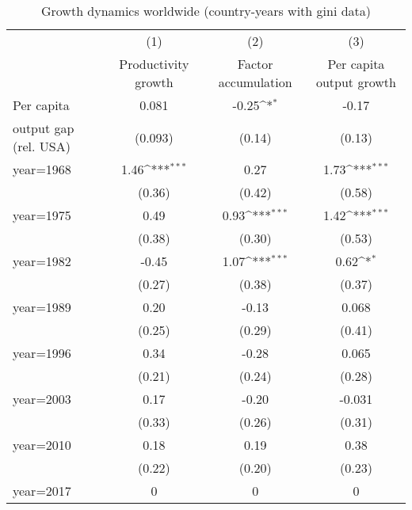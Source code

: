 \begin{table}[htbp]\centering
\def\sym#1{\ifmmode^{#1}\else\(^{#1}\)\fi}
\caption{Growth dynamics worldwide (country-years with gini data)}
\begin{tabular}{l*{3}{c}}
\toprule
                &\multicolumn{1}{c}{(1)}&\multicolumn{1}{c}{(2)}&\multicolumn{1}{c}{(3)}\\
                &\multicolumn{1}{c}{Productivity growth}&\multicolumn{1}{c}{Factor accumulation}&\multicolumn{1}{c}{Per capita output growth}\\
\midrule
Per capita      &    0.081         &    -0.25\sym{*}  &    -0.17         \\
output gap (rel. USA)&  (0.093)         &   (0.14)         &   (0.13)         \\
\addlinespace
year=1968       &     1.46\sym{***}&     0.27         &     1.73\sym{***}\\
                &   (0.36)         &   (0.42)         &   (0.58)         \\
\addlinespace
year=1975       &     0.49         &     0.93\sym{***}&     1.42\sym{***}\\
                &   (0.38)         &   (0.30)         &   (0.53)         \\
\addlinespace
year=1982       &    -0.45         &     1.07\sym{***}&     0.62\sym{*}  \\
                &   (0.27)         &   (0.38)         &   (0.37)         \\
\addlinespace
year=1989       &     0.20         &    -0.13         &    0.068         \\
                &   (0.25)         &   (0.29)         &   (0.41)         \\
\addlinespace
year=1996       &     0.34         &    -0.28         &    0.065         \\
                &   (0.21)         &   (0.24)         &   (0.28)         \\
\addlinespace
year=2003       &     0.17         &    -0.20         &   -0.031         \\
                &   (0.33)         &   (0.26)         &   (0.31)         \\
\addlinespace
year=2010       &     0.18         &     0.19         &     0.38         \\
                &   (0.22)         &   (0.20)         &   (0.23)         \\
\addlinespace
year=2017       &        0         &        0         &        0         \\

\end{tabular}
\end{table}
